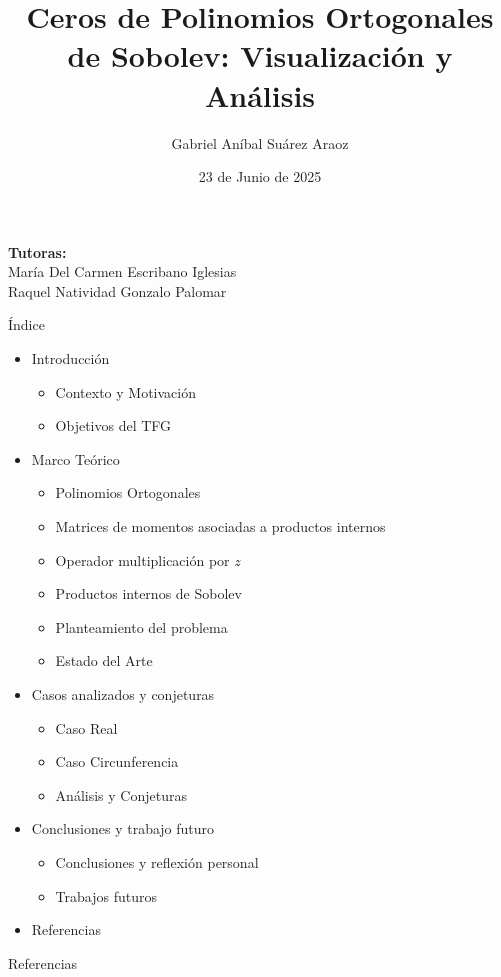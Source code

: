 \documentclass{beamer}
\title[Ceros de Polinomios Ortogonales de Sobolev]{Ceros de Polinomios Ortogonales de Sobolev: Visualización y Análisis} %
\author{Gabriel Aníbal Suárez Araoz}
\institute[UPM]{Universidad Politécnica de Madrid \\ Grado en Matemáticas e Informática}
\date{23 de Junio de 2025}
\newcommand{\tutoras}{%
    \vspace{0.5cm}
    \scriptsize
    \textbf{Tutoras:}\\
    María Del Carmen Escribano Iglesias\\
    Raquel Natividad Gonzalo Palomar
}
\begin{document}
\begin{frame}
	\titlepage
	\tutoras
\end{frame}

\begin{frame}{Índice}
	\begin{itemize}
		\item Introducción
		      \begin{itemize}
			      \item Contexto y Motivación
			      \item Objetivos del TFG
		      \end{itemize}
		\item Marco Teórico
		      \begin{itemize}
			      \item Polinomios Ortogonales
			      \item Matrices de momentos asociadas a productos internos
			      \item Operador multiplicación por $z$
			      \item Productos internos de Sobolev
			      \item Planteamiento del problema
			      \item Estado del Arte
		      \end{itemize}
		\item Casos analizados y conjeturas
		      \begin{itemize}
			      \item Caso Real
			      \item Caso Circunferencia
			      \item Análisis y Conjeturas
		      \end{itemize}
		\item Conclusiones y trabajo futuro
		      \begin{itemize}
			      \item Conclusiones y reflexión personal
			      \item Trabajos futuros
		      \end{itemize}
		\item Referencias
	\end{itemize}
\end{frame}






\begin{frame}[allowframebreaks]{Referencias}
	\scriptsize
\end{frame}
\end{document}
